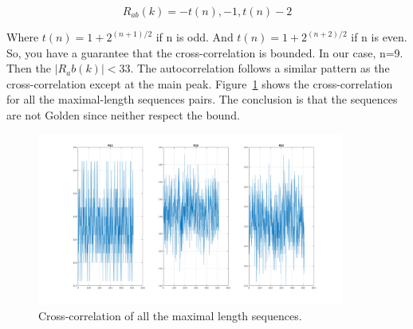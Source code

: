 \begin{equation}
	R_{ab}(k) = { -t(n), -1, t(n) - 2}
\end{equation}

Where $t(n) = 1 + 2^{(n+1)/2}$ if n is odd. And $t(n) = 1 + 2^{(n+2)/2}$ if n is
even. So, you have a guarantee that the cross-correlation is bounded. In our case,
n=9. Then the $|R_ab(k)| < 33$. The autocorrelation follows a similar pattern
as the cross-correlation except at the main peak. Figure~\ref{fig:ex9_crosscorr}
shows the cross-correlation for all the maximal-length sequences pairs. The
conclusion is that the sequences are not Golden since neither respect the bound.

\begin{figure}[H]
	\centering
	\includegraphics[width=0.9\textwidth]{figs/ex9_crosscorr.png}
	\caption{Cross-correlation of all the maximal length sequences.}
	\label{fig:ex9_crosscorr}
\end{figure}

